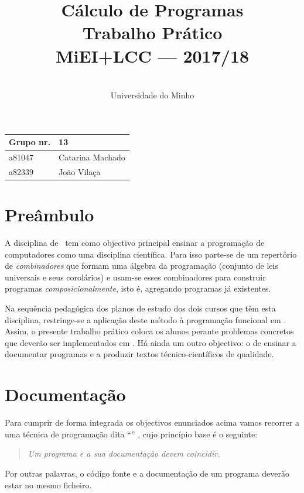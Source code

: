 \documentclass[a4paper]{article}
\title{
       	    Cálculo de Programas
\\
       	Trabalho Prático
\\
       	MiEI+LCC --- 2017/18
}
\author{
       	\dium
\\
       	Universidade do Minho
}
\date\mydate
\begin{document}
\maketitle

\begin{center}\large
\begin{tabular}{ll}
\textbf{Grupo} nr. & 13
\\\hline
a81047 & Catarina Machado
\\
a82339 & João Vilaça
\end{tabular}
\end{center}

\section{Preâmbulo}

A disciplina de \CP\ tem como objectivo principal ensinar
a progra\-mação de computadores como uma disciplina científica. Para isso
parte-se de um repertório de \emph{combinadores} que formam uma álgebra da
programação (conjunto de leis universais e seus corolários) e usam-se esses
combinadores para construir programas \emph{composicionalmente}, isto é,
agregando programas já existentes.

Na sequência pedagógica dos planos de estudo dos dois cursos que têm esta
disciplina, restringe-se a aplicação deste método à programação funcional
em \Haskell. Assim,
o presente trabalho prático coloca os alunos perante problemas
concretos que deverão ser implementados em \Haskell.
Há ainda um outro objectivo: o de ensinar a documentar programas e
a produzir textos técnico-científicos de qualidade.

\section{Documentação}
Para cumprir de forma integrada os objectivos enunciados acima vamos recorrer
a uma técnica de programa\-ção dita ``'' \cite{Kn92}, cujo
princípio base é o seguinte:
\begin{quote}\em
Um programa e a sua documentação devem coincidir.
\end{quote}
Por outras palavras, o código fonte e a documentação de um programa deverão estar no
mesmo ficheiro.
\end{document}
